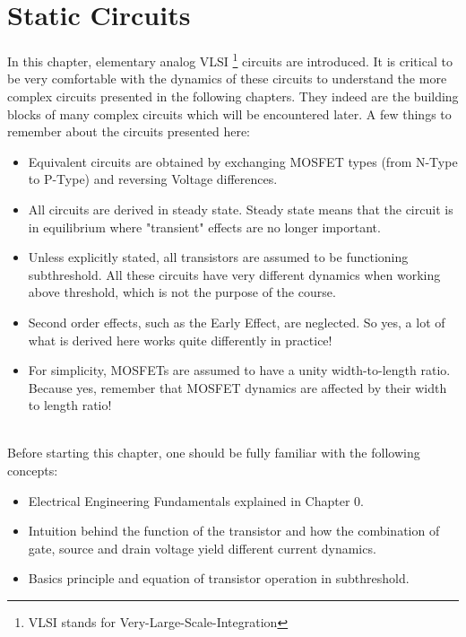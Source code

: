 \newpage
\section{Static Circuits}
In this chapter, elementary analog VLSI \footnote{VLSI stands for Very-Large-Scale-Integration} circuits are introduced. It is critical to be very comfortable with the dynamics of these circuits to understand the more complex circuits presented in the following chapters. They indeed are the building blocks of many complex circuits which will be encountered later. A few things to remember about the circuits presented here: 
\begin{itemize}
    \item Equivalent circuits are obtained by exchanging MOSFET types (from N-Type to P-Type) and reversing Voltage differences.
    \item All circuits are derived in steady state. Steady state means that the circuit is in equilibrium where "transient" effects are no longer important. 
    \item Unless explicitly stated, all transistors are assumed to be functioning subthreshold. All these circuits have very different dynamics when working above threshold, which is not the purpose of the course. 
    \item Second order effects, such as the Early Effect, are neglected. So yes, a lot of what is derived here works quite differently in practice!
    \item For simplicity, MOSFETs are assumed to have a unity width-to-length ratio. Because yes, remember that MOSFET dynamics are affected by their width to length ratio! 
\end{itemize}
\\
Before starting this chapter, one should be fully familiar with the following concepts: 
\begin{itemize}
    \item Electrical Engineering Fundamentals explained in Chapter 0.
    \item Intuition behind the function of the transistor and how the combination of gate, source and drain voltage yield different current dynamics. 
    \item Basics principle and equation of transistor operation in subthreshold. 
\end{itemize}








